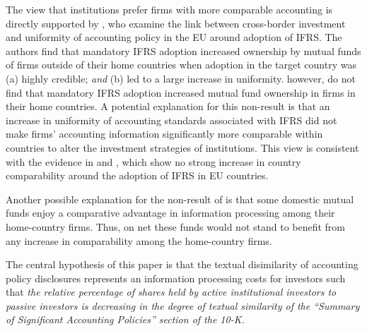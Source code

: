 \documentclass[thesis]{thesis-umich}
\begin{document}
The view that institutions prefer firms with more comparable accounting is directly supported by \cite{defondetal2011}, who examine the link between cross-border investment and uniformity of accounting policy in the EU around adoption of IFRS. The authors find that mandatory IFRS adoption increased ownership by mutual funds of firms outside of their home countries when adoption in the target country was (a) highly credible; \emph{and} (b) led to a large increase in uniformity. \cite{defondetal2011} however, do not find that mandatory IFRS adoption increased mutual fund ownership in firms in their home countries. A potential explanation for this non-result is that an increase in uniformity of accounting standards associated with IFRS did not make firms' accounting information significantly more comparable within countries to alter the investment strategies of institutions. This view is consistent with the evidence in \cite{yipyoung2012} and \cite{cascinogassen2015}, which show no strong increase in country comparability around the adoption of IFRS in EU countries.

Another possible explanation for the non-result of \cite{defondetal2011} is that some domestic mutual funds enjoy a comparative advantage in information processing among their home-country firms. Thus, on net these funds would not stand to benefit from any increase in comparability among the home-country firms. 

The central hypothesis of this paper is that the textual disimilarity of accounting policy disclosures represents an information processing costs for investors such that \emph{the relative percentage of shares held by active institutional investors to passive investors is decreasing in the degree of textual similarity of the ``Summary of Significant Accounting Policies'' section of the 10-K.}
\end{document}
